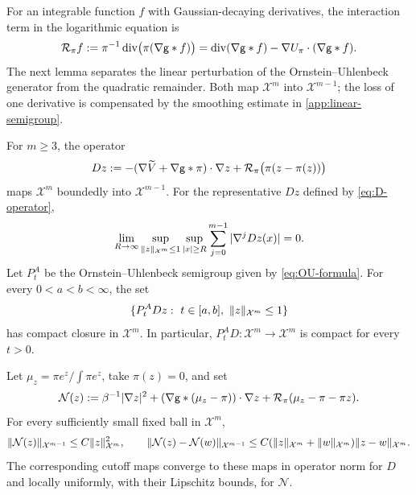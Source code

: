 \documentclass[11pt,reqno]{amsart}
\numberwithin{equation}{section}
\theoremstyle{plain}
\theoremstyle{remark}
\DeclarePairedDelimiter{\norm}{\lVert}{\rVert}
\DeclareMathOperator{\diver}{div}
\newcommand{\Xspace}{\mathcal X}
\begin{document}
For an integrable function $f$ with Gaussian-decaying derivatives, the interaction term in the logarithmic equation is
\begin{equation}\label{eq:Rf}
 \mathcal R_\pi f:=\pi^{-1}\diver\bigl(\pi(\nabla\g*f)\bigr)
 =\diver(\nabla\g*f)-\nabla U_\pi\cdot(\nabla\g*f).
\end{equation}
The next lemma separates the linear perturbation of the Ornstein--Uhlenbeck generator from the quadratic remainder. Both map $\Xspace^m$ into $\Xspace^{m-1}$; the loss of one derivative is compensated by the smoothing estimate in \cref{app:linear-semigroup}.

\begin{lemma}\label{lem:X-maps}
For $m\ge3$, the operator
\begin{equation}\label{eq:D-operator}
 Dz:=-(\nabla\widetilde V+\nabla\mathsf g*\pi)\cdot\nabla z+
          \mathcal R_\pi\bigl(\pi(z-\pi(z))\bigr)
\end{equation}
maps $\Xspace^m$ boundedly into $\Xspace^{m-1}$. For the representative $Dz$ defined by \eqref{eq:D-operator},
\begin{equation}\label{eq:D-uniform-decay}
 \lim_{R\to\infty}\sup_{\norm z_{\Xspace^m}\le1}
       \sup_{|x|\ge R}\sum_{j=0}^{m-1}|\nabla^jDz(x)|=0.
\end{equation}
Let $P_t^A$ be the Ornstein--Uhlenbeck semigroup given by \eqref{eq:OU-formula}. For every $0<a<b<\infty$, the set
\begin{equation}\label{eq:OU-D-compact-family}
 \{P_t^ADz:\ t\in[a,b],\ \norm z_{\Xspace^m}\le1\}
\end{equation}
has compact closure in $\Xspace^m$. In particular, $P_t^AD:\Xspace^m\to\Xspace^m$ is compact for every $t>0$.

Let $\mu_z=\pi e^z/\int\pi e^z$, take $\pi(z)=0$, and set
\begin{equation}\label{eq:nonlinear-remainder}
 \mathcal N(z):=\beta^{-1}|\nabla z|^2+
       (\nabla\mathsf g*(\mu_z-\pi))\cdot\nabla z+
       \mathcal R_\pi(\mu_z-\pi-\pi z).
\end{equation}
For every sufficiently small fixed ball in $\Xspace^m$,
\begin{equation}\label{eq:N-bounds}
 \norm{\mathcal N(z)}_{\Xspace^{m-1}}\le C\norm z_{\Xspace^m}^2,
 \qquad
 \norm{\mathcal N(z)-\mathcal N(w)}_{\Xspace^{m-1}}
       \le C(\norm z_{\Xspace^m}+\norm w_{\Xspace^m})\norm{z-w}_{\Xspace^m}.
\end{equation}
The corresponding cutoff maps converge to these maps in operator norm for $D$ and locally uniformly, with their Lipschitz bounds, for $\mathcal N$.
\end{lemma}
\end{document}
